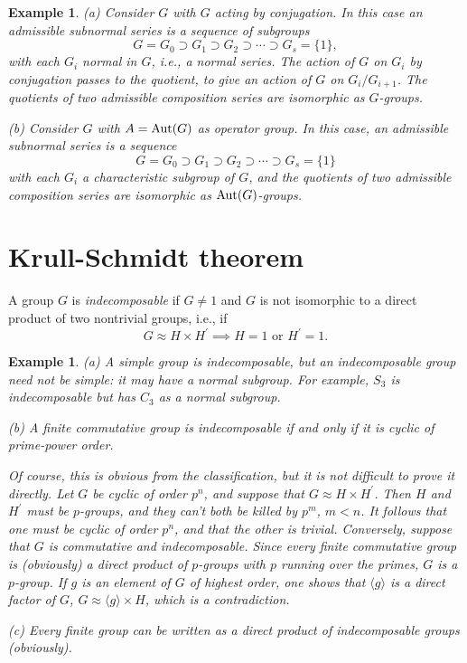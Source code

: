 \documentclass[a4paper,11pt,final]{memoir}%
\newtheorem{example}[X]{Example}
\theoremstyle{nonumberplain}
\begin{document}
\begin{example}
\label{ns27}(a) Consider $G$ with $G$ acting by conjugation. In this case an
admissible subnormal series is a sequence of subgroups
\[
G=G_{0}\supset G_{1}\supset G_{2}\supset\cdots\supset G_{s}=\{1\},
\]
with each $G_{i}$ normal in $G$, i.e., a normal series. The action of $G$ on
$G_{i}$ by conjugation passes to the quotient, to give an action of $G$ on
$G_{i}/G_{i+1}$. The quotients of two admissible composition series are
isomorphic as $G$-groups.

(b) Consider $G$ with $A=\operatorname{Aut}(G)$ as operator group. In this case, an
admissible subnormal series is a sequence
\[
G=G_{0}\supset G_{1}\supset G_{2}\supset\cdots\supset G_{s}=\{1\}
\]
with each $G_{i}$ a characteristic subgroup of $G$, and the quotients of two
admissible composition series are isomorphic as $\operatorname{Aut}(G)$-groups.
\end{example}

\section{Krull-Schmidt theorem}

A group $G$ is \emph{indecomposable}%
if $G\neq1$ and $G$ is not isomorphic to a direct product of two nontrivial
groups, i.e., if
\[
G\approx H\times H^{\prime}\implies H=1\text{ or }H^{\prime}=1.
\]


\begin{example}
\label{ns28}(a) A simple group is indecomposable, but an indecomposable group
need not be simple: it may have a normal subgroup. For example, $S_{3}$ is
indecomposable but has $C_{3}$ as a normal subgroup.

(b) A finite commutative group is indecomposable if and only if it is cyclic
of prime-power order.

Of course, this is obvious from the classification, but it is not difficult to
prove it directly. Let $G$ be cyclic of order $p^{n}$, and suppose that
$G\approx H\times H^{\prime}$. Then $H$ and $H^{\prime}$ must be $p$-groups,
and they can't both be killed by $p^{m}$, $m<n$. It follows that one must be
cyclic of order $p^{n}$, and that the other is trivial. Conversely, suppose
that $G$ is commutative and indecomposable. Since every finite commutative
group is (obviously) a direct product of $p$-groups with $p$ running over the
primes, $G$ is a $p$-group. If $g$ is an element of $G$ of highest order, one
shows that $\langle g\rangle$ is a direct factor of $G $, $G\approx\langle
g\rangle\times H$, which is a contradiction.

(c) Every finite group can be written as a direct product of indecomposable
groups (obviously).
\end{example}
\end{document}
